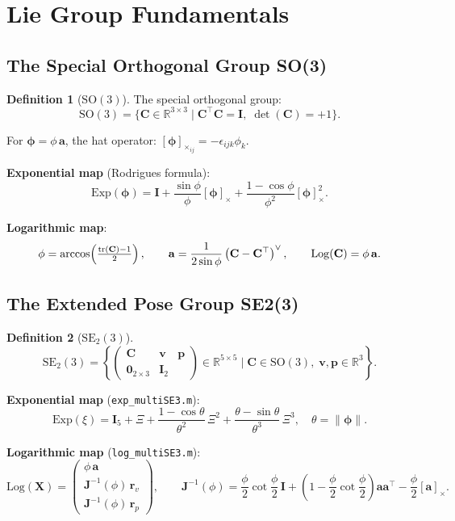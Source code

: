 \documentclass[11pt,a4paper]{article}
\theoremstyle{definition}
\newtheorem{definition}{Definition}[section]
\theoremstyle{plain}
\newcommand{\SO}{\mathrm{SO}(3)}
\newcommand{\Exp}{\mathrm{Exp}}
\newcommand{\Log}{\mathrm{Log}}
\newcommand{\skewb}[1]{[#1]_\times}
\begin{document}
\section{Lie Group Fundamentals}

\subsection{The Special Orthogonal Group SO(3)}

\begin{definition}[$\SO$]
The special orthogonal group:
\[
  \SO = \{\mathbf{C}\in\mathbb{R}^{3\times 3} \mid \mathbf{C}^\top\mathbf{C} = \mathbf{I},\;
         \det(\mathbf{C})=+1\}.
\]
\end{definition}

For $\bm{\phi} = \phi\,\mathbf{a}$, the hat operator: $\skewb{\bm\phi}_{ij} = -\epsilon_{ijk}\phi_k$.

\textbf{Exponential map} (Rodrigues formula):
\[
  \Exp(\bm\phi) = \mathbf{I} + \frac{\sin\phi}{\phi}\skewb{\bm\phi}
                + \frac{1-\cos\phi}{\phi^2}\skewb{\bm\phi}^2.
\]

\textbf{Logarithmic map}:
\[
  \phi = \arccos\!\left(\tfrac{\tr(\mathbf{C})-1}{2}\right), \qquad
  \mathbf{a} = \frac{1}{2\sin\phi}\left(\mathbf{C}-\mathbf{C}^\top\right)^\vee, \qquad
  \Log(\mathbf{C}) = \phi\,\mathbf{a}.
\]

\subsection{The Extended Pose Group SE2(3)}

\begin{definition}[$\mathrm{SE}_2(3)$]
\[
  \mathrm{SE}_2(3) = \left\{
    \begin{pmatrix}\mathbf{C} & \mathbf{v} & \mathbf{p}\\
                   \mathbf{0}_{2\times 3} & \mathbf{I}_2\end{pmatrix}
    \in\mathbb{R}^{5\times5}
    \;\Big|\; \mathbf{C}\in\SO,\;
              \mathbf{v},\mathbf{p}\in\mathbb{R}^3 \right\}.
\]
\end{definition}

\textbf{Exponential map} (\texttt{exp\_multiSE3.m}):
\[
  \Exp(\xi) = \mathbf{I}_{5} + \Xi +
              \frac{1-\cos\theta}{\theta^2}\,\Xi^2 +
              \frac{\theta-\sin\theta}{\theta^3}\,\Xi^3,
  \quad \theta = \|\bm\phi\|.
\]

\textbf{Logarithmic map} (\texttt{log\_multiSE3.m}):
\[
  \Log(\mathbf{X}) = \begin{pmatrix} \phi\,\mathbf{a} \\
                     \mathbf{J}^{-1}(\phi)\,\mathbf{r}_v \\
                     \mathbf{J}^{-1}(\phi)\,\mathbf{r}_p
                     \end{pmatrix}\!, \qquad
  \mathbf{J}^{-1}(\phi) = \frac{\phi}{2}\cot\frac{\phi}{2}\,\mathbf{I}
            + \left(1-\frac{\phi}{2}\cot\frac{\phi}{2}\right)\mathbf{a}\mathbf{a}^\top
            - \frac{\phi}{2}\skewb{\mathbf{a}}.
\]
\end{document}

